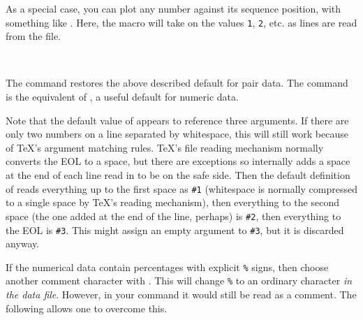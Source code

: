 \documentclass[letterpaper]{article}
\begin{document}
\begin{cd}
%
\end{cd}

As a special case, you can plot any number against its sequence
position, with something like
. Here, the macro
 will take on the values \texttt{1}, \texttt{2}, etc. as
lines are read from the file.

\begin{cd}
\\
%
%
\end{cd}

The command  restores the above described default
for pair data. The command  is the equivalent of
, a useful default for numeric data.

Note that the default value of  appears to reference three
arguments. If there are only two numbers on a line separated by
whitespace, this will still work because of \TeX{}'s argument matching
rules. \TeX{}'s file reading mechanism normally converts the EOL to a
space, but there are exceptions so \mfp{} internally adds a space at
the end of each line read in to be on the safe side. Then the default
definition of  reads everything up to the first space as
\texttt{\#1} (whitespace is normally compressed to a single space by
\TeX{}'s reading mechanism), then everything to the second space (the one
added at the end of the line, perhaps) is \texttt{\#2}, then everything
to the EOL is \texttt{\#3}. This might assign an empty argument to
\texttt{\#3}, but it is discarded anyway.

If the numerical data contain percentages with explicit \texttt{\%} signs,
then choose another comment character with . This
will change \texttt{\%} to an ordinary character \emph{in the data file}.
However, in your  command it would still be read as a comment.
The following allows one to overcome this.

\begin{cd}
\\
%
%
\end{cd}
\end{document}
